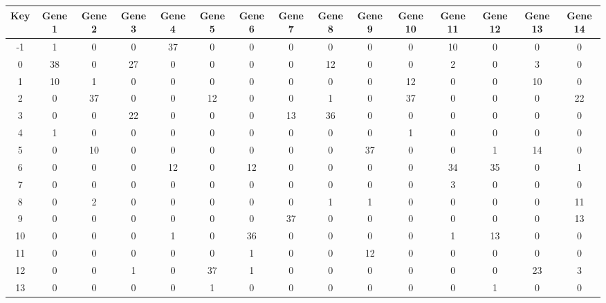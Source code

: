 \begin{tabular}{|c|c|c|c|c|c|c|c|c|c|c|c|c|c|c|}
\hline
Key & Gene 1 & Gene 2 & Gene 3 & Gene 4 & Gene 5 & Gene 6 & Gene 7 & Gene 8 & Gene 9 & Gene 10 & Gene 11 & Gene 12 & Gene 13 & Gene 14 \\
\hline
-1 & 1 & 0 & 0 & 37 & 0 & 0 & 0 & 0 & 0 & 0 & 10 & 0 & 0 & 0 \\
0 & 38 & 0 & 27 & 0 & 0 & 0 & 0 & 12 & 0 & 0 & 2 & 0 & 3 & 0 \\
1 & 10 & 1 & 0 & 0 & 0 & 0 & 0 & 0 & 0 & 12 & 0 & 0 & 10 & 0 \\
2 & 0 & 37 & 0 & 0 & 12 & 0 & 0 & 1 & 0 & 37 & 0 & 0 & 0 & 22 \\
3 & 0 & 0 & 22 & 0 & 0 & 0 & 13 & 36 & 0 & 0 & 0 & 0 & 0 & 0 \\
4 & 1 & 0 & 0 & 0 & 0 & 0 & 0 & 0 & 0 & 1 & 0 & 0 & 0 & 0 \\
5 & 0 & 10 & 0 & 0 & 0 & 0 & 0 & 0 & 37 & 0 & 0 & 1 & 14 & 0 \\
6 & 0 & 0 & 0 & 12 & 0 & 12 & 0 & 0 & 0 & 0 & 34 & 35 & 0 & 1 \\
7 & 0 & 0 & 0 & 0 & 0 & 0 & 0 & 0 & 0 & 0 & 3 & 0 & 0 & 0 \\
8 & 0 & 2 & 0 & 0 & 0 & 0 & 0 & 1 & 1 & 0 & 0 & 0 & 0 & 11 \\
9 & 0 & 0 & 0 & 0 & 0 & 0 & 37 & 0 & 0 & 0 & 0 & 0 & 0 & 13 \\
10 & 0 & 0 & 0 & 1 & 0 & 36 & 0 & 0 & 0 & 0 & 1 & 13 & 0 & 0 \\
11 & 0 & 0 & 0 & 0 & 0 & 1 & 0 & 0 & 12 & 0 & 0 & 0 & 0 & 0 \\
12 & 0 & 0 & 1 & 0 & 37 & 1 & 0 & 0 & 0 & 0 & 0 & 0 & 23 & 3 \\
13 & 0 & 0 & 0 & 0 & 1 & 0 & 0 & 0 & 0 & 0 & 0 & 1 & 0 & 0 \\
\hline
\end{tabular}